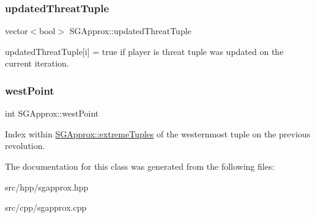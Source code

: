 \subsubsection{\texorpdfstring{updated\+Threat\+Tuple}{updatedThreatTuple}}
{\footnotesize\ttfamily vector$<$bool$>$ S\+G\+Approx\+::updated\+Threat\+Tuple\hspace{0.3cm}{\ttfamily [private]}}

updated\+Threat\+Tuple\mbox{[}i\mbox{]} = true if player i\textquotesingle{}s threat tuple was updated on the current iteration. \mbox{\label{classSGApprox_aa0c6296f28ce5527edc9829e4d9c23a1}} 
\subsubsection{\texorpdfstring{west\+Point}{westPoint}}
{\footnotesize\ttfamily int S\+G\+Approx\+::west\+Point\hspace{0.3cm}{\ttfamily [private]}}

Index within \hyperlink{classSGApprox_ab0e2c4678401f806922ac64667ad5ff6}{S\+G\+Approx\+::extreme\+Tuples} of the westernmost tuple on the previous revolution. 

The documentation for this class was generated from the following files\+:\begin{DoxyCompactItemize}
\item 
src/hpp/sgapprox.\+hpp\item 
src/cpp/sgapprox.\+cpp\end{DoxyCompactItemize}

